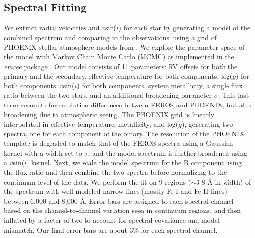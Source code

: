 \documentclass[]{aastex701} %
\begin{document}
\subsection{Spectral Fitting}

We extract radial velocities and $v$sin($i$) for each star by generating a model of the combined spectrum and comparing to the observations, using a grid of PHOENIX stellar atmosphere models \citep{hauschildt:1999} from \citet{Husser2013}. We explore the parameter space of the model with Markov Chain Monte Carlo (MCMC) as implemented in the \textit{emcee} package \citep{emcee}. Our model consists of 11 parameters: RV offsets for both the primary and the secondary, effective temperature for both components, log($g$) for both components, $v$sin($i$) for both components, system metallicity, a single flux ratio between the two stars, and an additional broadening parameter $\sigma$. This last term accounts for resolution differences between FEROS and PHOENIX, but also broadening due to atmospheric seeing. The PHOENIX grid is linearly interpolated in effective temperature, metallicity, and log($g$), generating two spectra, one for each component of the binary. The resolution of the PHOENIX template is degraded to match that of the FEROS spectra using a Gaussian kernel with a width set to $\sigma$, and the model spectrum is further broadened using a $v$sin($i$) kernel. Next, we scale the model spectrum for the B component using the flux ratio and then combine the two spectra before normalizing to the continuum level of the data. We perform the fit on 9 regions ($\sim$3-8 \r{A} in width) of the spectrum with well-modeled narrow lines (mostly Fe I and Fe II lines) between 6,000 and 8,000 \r{A}. Error bars are assigned to each spectral channel based on the channel-to-channel variation seen in continuum regions, and then inflated by a factor of two to account for spectral covariance and model mismatch. Our final error bars are about 3\% for each spectral channel.
\end{document}
